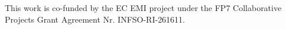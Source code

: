 \newpage
This work is co-funded by the EC EMI project under the FP7 Collaborative Projects Grant Agreement Nr. INFSO-RI-261611.
\newpage
